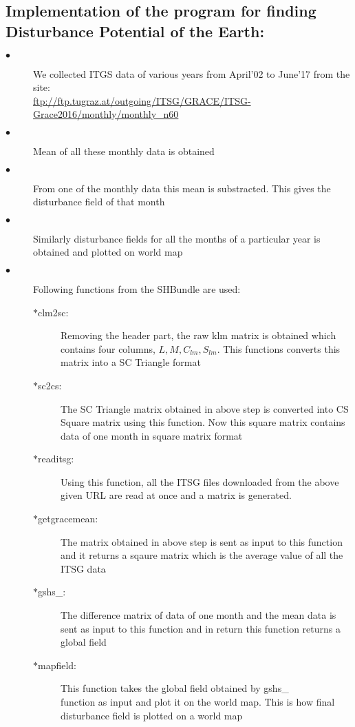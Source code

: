 \documentclass[a4paper,12pt]{article}
\begin{document}
\subsection{Implementation of the program for finding\\Disturbance Potential of the Earth:}
\begin{description}
\item[$\bullet$]We collected ITGS data of various years from April'02 to June'17 from the site:\\
\url{ftp://ftp.tugraz.at/outgoing/ITSG/GRACE/ITSG-Grace2016/monthly/monthly_n60}
\item[$\bullet$]Mean of all these monthly data is obtained
\item[$\bullet$]From one of the monthly data this mean is substracted. This gives the disturbance field of that month
\item[$\bullet$]Similarly disturbance fields for all the months of a particular year is obtained and plotted on world map
\item[$\bullet$]Following functions from the SHBundle are used:
	\begin{description}
	\item[$\ast$clm2sc:]Removing the header part, the raw 			klm matrix is obtained which contains four columns, $L, 	M, C_{lm}, S_{lm}$. This functions converts this matrix 	into a SC Triangle format
	\item[$\ast$sc2cs:]The SC Triangle matrix obtained in 			above step is converted into CS Square matrix using 			this function. Now this square matrix contains data of 			one month in square matrix format
	\item[$\ast$readitsg:]Using this function, all the ITSG 	files downloaded from the above given URL are read at 			once and a matrix is generated.
	\item[$\ast$getgracemean:]The matrix obtained in above 			step is sent as input to this function and it returns a 	sqaure matrix which is the average value of all the 			ITSG data
	\item[$\ast$gshs\_:]The difference matrix of data of 			one month and the mean data is sent as input to this 			function and in return this function returns a global 			field
	\item[$\ast$mapfield:]This function takes the global 			field obtained by gshs\_\\ function as input and plot 			it on the world map. This is how final disturbance 			field is plotted on a world map\\\\
	\end{description}
\end{description}
\end{document}
